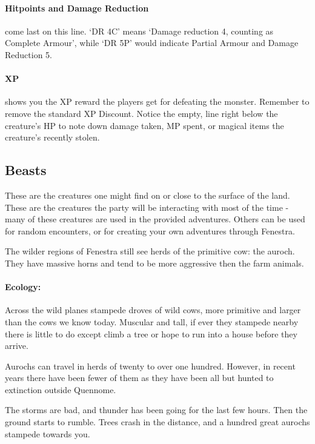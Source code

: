 \begin{multicols}{2}
\paragraph{Hitpoints and Damage Reduction} come last on this line.  `DR 4C' means `Damage reduction 4, counting as Complete Armour', while `DR 5P' would indicate Partial Armour and Damage Reduction 5.

\paragraph{XP} shows you the XP reward the players get for defeating the monster.  Remember to remove the standard XP Discount.  Notice the empty, line right below the creature's HP to note down damage taken, MP spent, or magical items the creature's recently stolen.

\subsection{Beasts}

These are the creatures one might find on or close to the surface of the land.  These are the creatures the party will be interacting with most of the time - many of these creatures are used in the provided adventures.  Others can be used for random encounters, or for creating your own adventures through Fenestra.

\label{auroch}

The wilder regions of Fenestra still see herds of the primitive cow: the auroch.
They have massive horns and tend to be more aggressive then the farm animals.


\paragraph{Ecology:} Across the wild planes stampede droves of wild cows, more primitive and larger than the cows we know today.  Muscular and tall, if ever they stampede nearby there is little to do except climb a tree or hope to run into a house before they arrive.

Aurochs can travel in herds of twenty to over one hundred.  However, in recent years there have been fewer of them as they have been all but hunted to extinction outside Quennome.

\begin{boxtext}

	The storms are bad, and thunder has been going for the last few hours.  Then the ground starts to rumble.  Trees crash in the distance, and a hundred great aurochs stampede towards you.


\end{boxtext}
\end{multicols}
